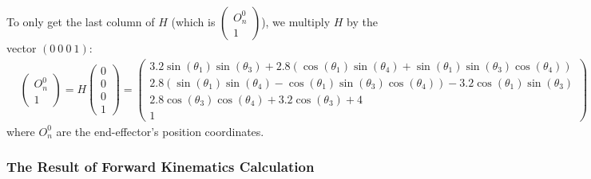 \documentclass[11pt]{article}
\begin{document}
To only get the last column of $H$ (which is $\begin{pmatrix}O_{n}^{0}\\ 1\end{pmatrix}$), we multiply $H$ by the vector $(0 \: 0 \: 0 \: 1)$:
\begin{equation}
\begin{split}
    & \begin{pmatrix}O_{n}^{0}\\ 1\end{pmatrix} = H\begin{pmatrix}0\\ 0\\ 0\\ 1\end{pmatrix}
    = \begin{pmatrix}3.2\sin \left(\theta _{1}\right)\sin \left(\theta _{3}\right)+2.8\left(\cos \left(\theta _{1}\right)\sin \left(\theta _{4}\right)+\sin \left(\theta _{1}\right)\sin \left(\theta _{3}\right)\cos \left(\theta _{4}\right)\right)\\ 2.8\left(\sin \left(\theta _{1}\right)\sin \left(\theta _{4}\right)-\cos \left(\theta _{1}\right)\sin \left(\theta _{3}\right)\cos \left(\theta _{4}\right)\right)-3.2\cos \left(\theta _{1}\right)\sin \left(\theta _{3}\right)\\ 2.8\cos \left(\theta _{3}\right)\cos \left(\theta _{4}\right)+3.2\cos \left(\theta _{3}\right)+4\\ 1\end{pmatrix}
\end{split}
\end{equation}
where $O_{n}^{0}$ are the end-effector's position coordinates.

\subsubsection{The Result of Forward Kinematics Calculation}
\end{document}
